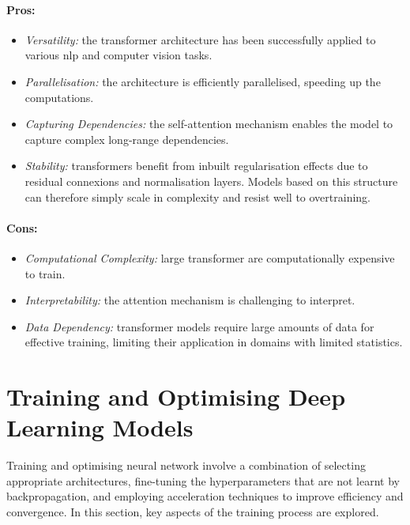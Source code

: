 \paragraph{Pros:}
\begin{itemize}
    \item \textit{Versatility:} the transformer architecture has been successfully applied to various \gls{nlp} and computer vision tasks.
    \item \textit{Parallelisation:} the architecture is efficiently parallelised, speeding up the computations.
    \item \textit{Capturing Dependencies:} the self-attention mechanism enables the model to capture complex long-range dependencies.
    \item \textit{Stability:} transformers benefit from inbuilt regularisation effects due to residual connexions and normalisation layers. Models based on this structure can therefore simply scale in complexity and resist well to overtraining.
\end{itemize}

\paragraph{Cons:}
\begin{itemize}
    \item \textit{Computational Complexity:} large transformer are computationally expensive to train.
    \item \textit{Interpretability:} the attention mechanism is challenging to interpret.
    \item \textit{Data Dependency:} transformer models require large amounts of data for effective training, limiting their application in domains with limited statistics.
\end{itemize}

\section{Training and Optimising Deep Learning Models}
Training and optimising neural network involve a combination of selecting appropriate architectures, fine-tuning the hyperparameters that are not learnt by backpropagation, and employing acceleration techniques to improve efficiency and convergence. In this section, key aspects of the training process are explored.

